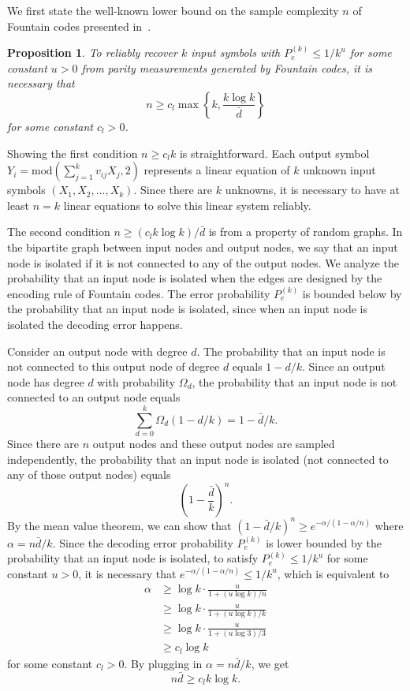 \documentclass[11pt,onecolumn]{IEEEtran}
\newtheorem{prop}{Proposition}
\renewcommand{\mod}{\mathrm{mod}}
\newcommand{\beq}{\begin{equation}}
\newcommand{\eeq}{\end{equation}}
\newcommand{\bard}{\bar{d}}
\begin{document}
We first state the well-known lower bound on the sample complexity $n$ of Fountain codes presented in~\cite{shokrollahi2006raptor}.
\begin{prop}\label{prop:suff}
{\it
To reliably recover $k$ input symbols with $P_e^{(k)}\leq 1/k^u$ for some constant $u>0$ from parity measurements generated by Fountain codes, it is necessary that
\beq\label{eqn:lower}
n\geq c_l\max\left\{k,\frac{k\log k}{\bar{d}}\right\}
\eeq
for some constant $c_l>0$.
}
\end{prop}
\begin{IEEEproof}
Showing the first condition $n\geq c_l k$ is straightforward. Each output symbol $Y_i=\mod\left(\sum_{j=1}^k v_{ij} X_j,2\right)$ represents a linear equation of $k$ unknown input symbols $(X_1,X_2,\dots, X_k)$. Since there are $k$ unknowns, it is necessary to have at least $n=k$ linear equations to solve this linear system reliably. 

The second condition $n\geq (c_l {k\log k})/{\bard}$ is from a property of random graphs. In the bipartite graph between input nodes and output nodes, we say that an input node is isolated if it is not connected to any of the output nodes. We analyze the probability that an input node is isolated when the edges are designed by the encoding rule of Fountain codes. The error probability $P_e^{(k)}$ is bounded below by the probability that an input node is isolated, since when an input node is isolated the decoding error happens. 

Consider an output node with degree $d$. The probability that an input node is not connected to this output node of degree $d$ equals $1-d/k$. Since an output node has degree $d$ with probability $\Omega_d$, the probability that an input node is not connected to an output node equals
\beq
\sum_{d=0}^k \Omega_d (1-d/k)=1-\bar{d}/k.
\eeq
Since there are $n$ output nodes and these output nodes are sampled independently, the probability that an input node is isolated (not connected to any of those output nodes) equals
\beq
\left(1-\frac{\bar{d}}{k}\right)^{n}.
\eeq
By the mean value theorem, we can show that $(1-\bar{d}/{k})^{n}\geq e^{-\alpha/(1-\alpha/n)}$ where $\alpha=n\bar{d}/k$.
Since the decoding error probability $P_e^{(k)}$ is lower bounded by the probability that an input node is isolated, to satisfy $P_e^{(k)}\leq 1/k^u$ for some constant $u>0$, it is necessary that $e^{-\alpha/(1-\alpha/n)}\leq 1/k^u$, which is equivalent to
\beq
\begin{split}
\alpha&\geq \log k\cdot\frac{u}{1+(u\log k)/n}\\
&\geq \log k \cdot \frac{u}{1+(u\log k)/k}\\
&\geq \log k\cdot  \frac{u}{1+(u\log 3)/3}\\
&\geq c_l\log k
\end{split}
\eeq
for some constant $c_l>0$.
By plugging in $\alpha=n\bar{d}/k$, we get
\beq
n\bar{d}\geq c_l k\log k.
\eeq
\end{IEEEproof}
\end{document}
